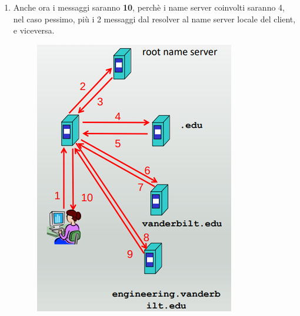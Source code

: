 \documentclass[11pt,a4paper,oneside]{book}
\theoremstyle{definition}
\begin{document}
\begin{enumerate}
\begin{enumerate}
\begin{figure}[!h]
			            \centering
		            \end{figure}\newline
		      \item Anche ora i messaggi saranno \textbf{10}, perchè i name server coinvolti saranno 4, nel caso pessimo, più i 2 messaggi dal resolver al name server locale del client, e viceversa.
		            \begin{figure}[!h]
			            \includegraphics[scale=0.25]{Immagini/Es1_2.png}
			            \centering
		            \end{figure}\newline
	      \end{enumerate}

	      \pagebreak


\end{enumerate}
\end{document}
